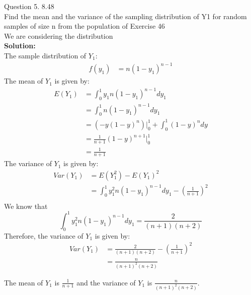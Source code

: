 \documentclass[answers,12pt,addpoints]{exam}
\begin{document}
\begin{questions}
    \question Question 5. 8.48\\
    Find the mean and the variance of the sampling distribution of Y1 for random samples of size n from the population of Exercise 46\\
    We are considering the distribution \\
    \textbf{Solution:}\\
    The sample distribution of $Y_1$:
    \begin{align*}
        f(y_1) &= n (1-y_1)^{n-1}
    \end{align*} 
    The mean of $Y_1$ is given by:
    \begin{align*}
        E(Y_1) &= \int_0^1 y_1 n (1-y_1)^{n-1} dy_1\\
        &= \int_0^1 n (1-y_1)^{n-1} dy_1\\
        &= (-y(1-y)^n) \Big|_0^1 + \int_0^1 (1-y)^n dy\\
        &= \frac{1}{n+1}(1-y)^{n+1} \Big|_0^1\\
        &= \frac{1}{n+1}
    \end{align*}
    The variance of $Y_1$ is given by:
    \begin{align*}
        Var(Y_1) &= E(Y_1^2) - E(Y_1)^2\\
        &= \int_0^1 y_1^2 n (1-y_1)^{n-1} dy_1 - \left( \frac{1}{n+1} \right)^2\\
    \end{align*}
    We know that 
    $$ \int_0^1 y_1^2 n (1-y_1)^{n-1} dy_1 = \frac{2}{(n+1)(n+2)}$$
    Therefore, the variance of $Y_1$ is given by:
    \begin{align*}
        Var(Y_1) &= \frac{2}{(n+1)(n+2)} - \left( \frac{1}{n+1} \right)^2\\
        &= \frac{n}{(n+1)^2(n+2)}
    \end{align*}
    \begin{solution}
        The mean of $Y_1$ is $\frac{1}{n+1}$ and the variance of $Y_1$ is $\frac{n}{(n+1)^2(n+2)}$.
    \end{solution}


\end{questions}
\end{document}
